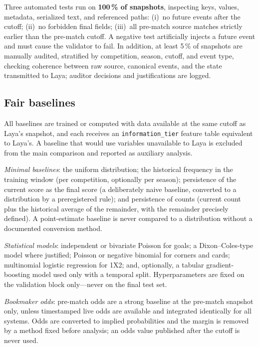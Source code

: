 \documentclass[11pt]{article}
\begin{document}
Three automated tests run on \textbf{100\,\% of snapshots}, inspecting keys,
values, metadata, serialized text, and referenced paths:
(i)~no future events after the cutoff; (ii)~no forbidden final fields;
(iii)~all pre-match source matches strictly earlier than the pre-match
cutoff. A negative test artificially injects a future event and must cause
the validator to fail. In addition, at least 5\,\% of snapshots are manually
audited, stratified by competition, season, cutoff, and event type, checking
coherence between raw source, canonical events, and the state transmitted to
Laya; auditor decisions and justifications are logged.

\subsection{Fair baselines}
\label{sec:baselines}

All baselines are trained or computed with data available at the same cutoff
as Laya's snapshot, and each receives an \texttt{information\_tier} feature
table equivalent to Laya's. A baseline that would use variables unavailable
to Laya is excluded from the main comparison and reported as auxiliary
analysis.

\emph{Minimal baselines}: the uniform distribution; the historical frequency
in the training window (per competition, optionally per season); persistence
of the current score as the final score (a deliberately naive baseline,
converted to a distribution by a preregistered rule); and persistence of
counts (current count plus the historical average of the remainder, with the
remainder precisely defined). A point-estimate baseline is never compared to
a distribution without a documented conversion method.

\emph{Statistical models}: independent or bivariate Poisson for goals; a
Dixon--Coles-type model where justified; Poisson or negative binomial for
corners and cards; multinomial logistic regression for 1X2; and, optionally, a
tabular gradient-boosting model used only with a temporal split.
Hyperparameters are fixed on the validation block only---never on the final
test set.

\emph{Bookmaker odds}: pre-match odds are a strong baseline at the pre-match
snapshot only, unless timestamped live odds are available and integrated
identically for all systems. Odds are converted to implied probabilities and
the margin is removed by a method fixed before analysis; an odds value
published after the cutoff is never used.
\end{document}
